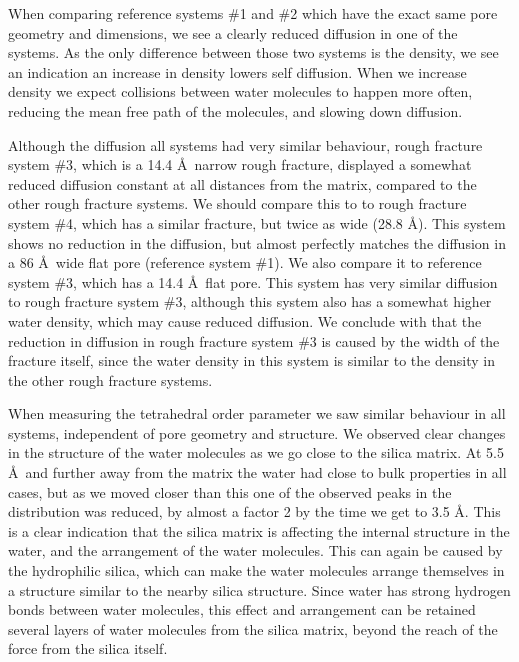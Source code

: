 When comparing reference systems \#1 and \#2 which have the exact same pore geometry and dimensions, we see a clearly reduced diffusion in one of the systems. As the only difference between those two systems is the density, we see an indication an increase in density lowers self diffusion. When we increase density we expect collisions between water molecules to happen more often, reducing the mean free path of the molecules, and slowing down diffusion. 

Although the diffusion all systems had very similar behaviour, rough fracture system \#3, which is a 14.4 \AA\ narrow rough fracture, displayed a somewhat reduced diffusion constant at all distances from the matrix, compared to the other rough fracture systems. We should compare this to to rough fracture system \#4, which has a similar fracture, but twice as wide (28.8 \AA). This system shows no reduction in the diffusion, but almost perfectly matches the diffusion in a 86 \AA\ wide flat pore (reference system \#1). We also compare it to reference system \#3, which has a 14.4 \AA\ flat pore. This system has very similar diffusion to rough fracture system \#3, although this system also has a somewhat higher water density, which may cause reduced diffusion. We conclude with that the reduction in diffusion in rough fracture system \#3 is caused by the width of the fracture itself, since the water density in this system is similar to the density in the other rough fracture systems. 


When measuring the tetrahedral order parameter we saw similar behaviour in all systems, independent of pore geometry and structure. We observed clear changes in the structure of the water molecules as we go close to the silica matrix. At 5.5 \AA\ and further away from the matrix the water had close to bulk properties in all cases, but as we moved closer than this one of the observed peaks in the distribution was reduced, by almost a factor 2 by the time we get to 3.5 \AA. This is a clear indication that the silica matrix is affecting the internal structure in the water, and the arrangement of the water molecules. This can again be caused by the hydrophilic silica, which can make the water molecules arrange themselves in a structure similar to the nearby silica structure. Since water has strong hydrogen bonds between water molecules, this effect and arrangement can be retained several layers of water molecules from the silica matrix, beyond the reach of the force from the silica itself.

